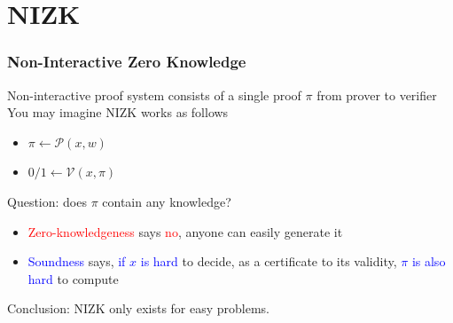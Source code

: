\documentclass[handout]{beamer} %
\newcommand{\blue}[1]{\textcolor{blue}{#1}}
\newcommand{\dgreen}[1]{\textcolor{dgreen}{#1}}
\newcommand{\red}[1]{\textcolor{red}{#1}}
\begin{document}
\section{NIZK}

\frame
{
  \frametitle{Non-Interactive Zero Knowledge}
  \onslide<+-> Non-interactive proof system consists of a single proof $\pi$ from prover to verifier\\\vspace{0.3cm}
  \onslide<+-> You may imagine NIZK works as follows
  \begin{itemize}
    \item<+-> $\pi\leftarrow\mathcal{P}(x,w)$
    \item<+-> $0/1\leftarrow\mathcal{V}(x,\pi)$
  \end{itemize}
  \onslide<+-> Question: does $\pi$ contain any knowledge?
  \begin{itemize}
    \item<+-> \red{Zero-knowledgeness} says \red{no}, anyone can easily generate it
    \item<+-> \blue{Soundness} says, \blue{if $x$ is hard} to decide, as a certificate to its validity, \blue{$\pi$ is also hard} to compute
  \end{itemize}
  \onslide<+-> Conclusion: NIZK only exists for easy problems.
}
\end{document}
